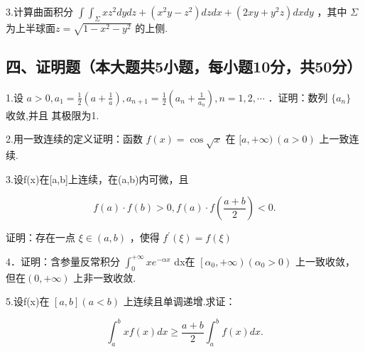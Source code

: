 \documentclass[11pt,fontset=fandol]{ctexart}
\begin{document}
3.计算曲面积分
\(\int \int _ { \Sigma } { x z ^ { 2 } d y d z } + ( x ^ { 2 } y - z ^ { 2 } ) d z d x + ( 2 x y + y ^ { 2 } z ) d x d y\)
，其中 \(\Sigma\) 为上半球面\(z = \sqrt { 1 - x ^ { 2 } - y ^ { 2 } }\)
的上侧.

\subsection{四、证明题（本大题共5小题，每小题10分，共50分）}\label{ux56dbux8bc1ux660eux9898ux672cux5927ux9898ux51715ux5c0fux9898ux6bcfux5c0fux989810ux5206ux517150ux5206}

1.设
\(a > 0 , a _ { 1 } = \frac { 1 } { 2 } \left( a + \frac { 1 } { a } \right) , a _ { n + 1 } = \frac { 1 } { 2 } \left( a _ { n } + \frac { 1 } { a _ { n } } \right) , n = 1 , 2 , \cdots\)
．证明：数列 \(\{ a _ { n } \}\) 收敛,并且 其极限为1.

2.用一致连续的定义证明：函数 \(f ( x ) { = } \cos { \sqrt { x } }\) 在
\([ a , + \infty ) \ ( a > 0 )\) 上一致连续.

3.设f(x)在{[}a,b{]}上连续，在(a,b)内可微，且

\[
f ( a ) \cdot f ( b ) > 0 , f ( a ) \cdot f \left( \frac { a + b } { 2 } \right) < 0 .
\]

证明：存在一点 \(\xi \in ( a , b )\) ，使得
\(f ^ { \prime } ( \xi ) = f ( \xi )\)

4．证明：含参量反常积分
\(\int _ { 0 } ^ { + \infty } x e ^ { - \alpha x }\) dx在
\(\left[ \alpha _ { 0 } , + \infty \right) \left( \alpha _ { 0 } > 0 \right)\)
上一致收敛，但在\(( 0 , + \infty )\) 上非一致收敛.

5.设f(x)在 \([ a , b ] ( a < b )\) 上连续且单调递增.求证：

\[
\int _ { a } ^ { b } x f ( x ) d x \geq { \frac { a + b } { 2 } } \int _ { a } ^ { b } f ( x ) d x .
\]
\end{document}
